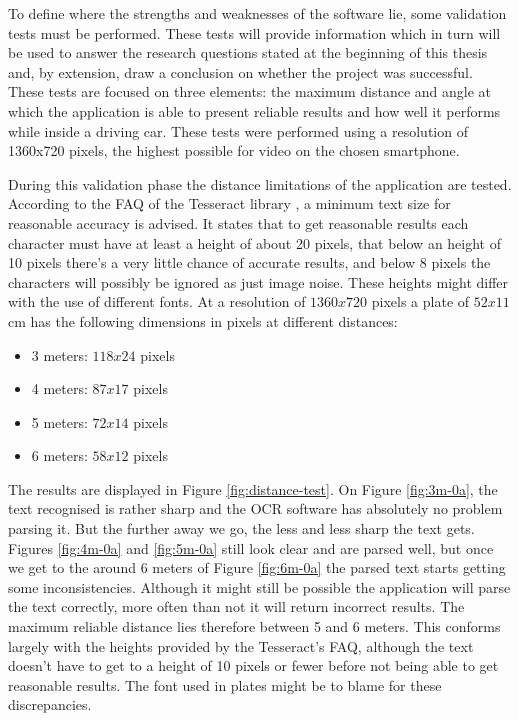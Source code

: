 To define where the strengths and weaknesses of the software lie, some validation tests must be performed. These tests will provide information which in turn will be used to answer the research questions stated at the beginning of this thesis and, by extension, draw a conclusion on whether the project was successful. These tests are focused on three elements: the maximum distance and angle at which the application is able to present reliable results and how well it performs while inside a driving car. These tests were performed using a resolution of 1360x720 pixels, the highest possible for video on the chosen smartphone.


During this validation phase the distance limitations of the application are tested. According to the FAQ of the Tesseract library \cite{tesseract-faq}, a minimum text size for reasonable accuracy is advised. It states that to get reasonable results each character must have at least a height of about 20 pixels, that below an height of 10 pixels there's a very little chance of accurate results, and below 8 pixels the characters will possibly be ignored as just image noise. These heights might differ with the use of different fonts. At a resolution of $1360x720$ pixels a plate of $52x11$ cm has the following dimensions in pixels at different distances:

\begin{itemize}
	\item 3 meters: $118x24$ pixels
	\item 4 meters: $87x17$ pixels
	\item 5 meters: $72x14$ pixels
	\item 6 meters: $58x12$ pixels
\end{itemize}

The results are displayed in Figure \ref{fig:distance-test}. On Figure \ref{fig:3m-0a}, the text recognised is rather sharp and the OCR software has absolutely no problem parsing it. But the further away we go, the less and less sharp the text gets. Figures \ref{fig:4m-0a} and \ref{fig:5m-0a} still look clear and are parsed well, but once we get to the around 6 meters of Figure \ref{fig:6m-0a} the parsed text starts getting some inconsistencies. Although it might still be possible the application will parse the text correctly, more often than not it will return incorrect results. The maximum reliable distance lies therefore between 5 and 6 meters. This conforms largely with the heights provided by the Tesseract's FAQ, although the text doesn't have to get to a height of 10 pixels or fewer before not being able to get reasonable results. The font used in plates might be to blame for these discrepancies.

